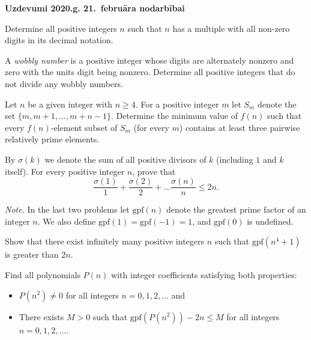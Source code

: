 \documentclass[11pt]{article}
\begin{document}
\begin{center}
{\Large \bf Uzdevumi 2020.g. 21.\ februāra nodarbībai}
\end{center}

\vspace{10pt}

\begin{problem}
Determine all positive integers $n$ such that $n$ has a multiple
with all non-zero digits in its decimal notation. 
\end{problem}

\begin{problem}
A {\em wobbly number} is a positive integer whose digits are alternately nonzero and
zero with the units digit being nonzero. Determine all positive 
integers that do not divide any wobbly numbers. 
\end{problem}

\begin{problem}
Let $n$ be a given integer with $n \geq 4$. For a positive integer $m$ 
let $S_m$ denote the set 
$\{ m, m+1, \ldots, m+n-1 \}$. 
Determine the minimum value of $f(n)$ such that every $f(n)$-element subset of $S_m$
(for every $m$) contains at least three pairwise relatively 
prime elements.
\end{problem}

\begin{problem}
By $\sigma(k)$ we denote the sum of all positive divisors of $k$ (including $1$ and $k$ itself). 
For every positive integer $n$, prove that 
$$\frac{\sigma(1)}{1} + \frac{\sigma(2)}{2} + \ldots \frac{\sigma(n)}{n} \leq 2n.$$
\end{problem}

\vspace{10pt}
{\em Note.} In the last two problems let
$\text{gpf}(n)$ denote the greatest prime factor of an integer $n$.
We also define $\text{gpf}(1) = \text{gpf}(-1) = 1$, and $\text{gpf}(0)$ is undefined.

\begin{problem}
Show that there exist infinitely many positive 
integers $n$ such that $\text{gpf}(n^4 + 1)$ is greater than $2n$. 
\end{problem}


\begin{problem}
Find all polynomials $P(n)$ with integer coefficients satisfying both properties:
\begin{itemize}
\item $P(n^2) \neq 0$ for all integers $n = 0,1,2,\ldots$ and 
\item There exists $M >0$ such that $\text{gpf}(P(n^2)) - 2n \leq M$ for all integers $n = 0,1,2,\ldots$.
\end{itemize}
\end{problem}
\end{document}
